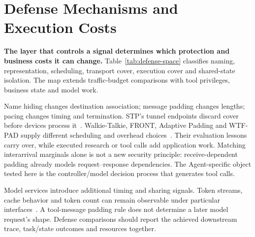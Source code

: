 \section{Defense Mechanisms and Execution Costs}\label{sec:defenses}
\textbf{The layer that controls a signal determines which protection and business costs it can change.}
Table~\ref{tab:defense-space} classifies naming, representation, scheduling, transport cover, execution cover and shared-state isolation. The map extends traffic-budget comparisons with tool privileges, business state and model work.



Name hiding changes destination association; message padding changes lengths; pacing changes timing and termination. STP's tunnel endpoints discard cover before devices process it~\cite{apthorpe2019stp}. Walkie-Talkie, FRONT, Adaptive Padding and WTF-PAD supply different scheduling and overhead choices~\cite{wang2017walkietalkie,gong2020front,shmatikov2006adaptive,juarez2016wtfpad}. Their evaluation lessons carry over, while executed research or tool calls add application work. Matching interarrival marginals alone is not a new security principle: receive-dependent padding already models request--response dependencies. The Agent-specific object tested here is the controller/model decision process that generates tool calls.

Model services introduce additional timing and sharing signals. Token streams, cache behavior and token count can remain observable under particular interfaces~\cite{weiss2024prompt,whisperleak2025,earlybird2025,timewilltell2024,carlini2024timing,wu2026cacheprune}. A tool-message padding rule does not determine a later model request's shape. Defense comparisons should report the achieved downstream trace, task/state outcomes and resources together.

